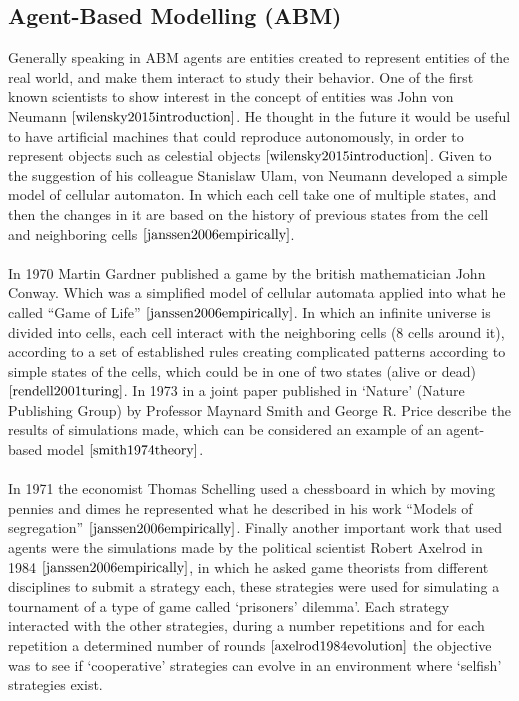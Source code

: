 \subsection{Agent-Based Modelling (ABM)}
Generally speaking in ABM agents are entities created to represent entities of the real world, and make them interact to study their behavior. One of the first known scientists to show interest in the concept of entities was John von Neumann $\cite{wilensky2015introduction}$. He thought in the future it would be useful to have artificial machines that could reproduce autonomously, in order to represent objects such as celestial objects $\cite{wilensky2015introduction}$. Given to the suggestion of his colleague Stanislaw Ulam, von Neumann developed a simple model of cellular automaton. In which each cell take one of multiple states, and then the changes in it are based on the history of previous states from the cell and neighboring cells $\cite{janssen2006empirically}$.
\\\\In 1970 Martin Gardner published a game by the british mathematician John Conway. Which was a simplified model of cellular automata applied into what he called “Game of Life” $\cite{janssen2006empirically}$. In which an infinite universe is divided into cells, each cell interact with the neighboring cells (8 cells around it), according to a set of established rules creating complicated patterns according to simple states of the cells, which could be in one of two states (alive or dead) $\cite{rendell2001turing}$. In 1973 in a joint paper published in `Nature' (Nature Publishing Group)  by Professor Maynard Smith and George R. Price describe the results of simulations made, which can be considered an example of an agent-based model $\cite{smith1974theory}$.
\\\\In 1971 the economist Thomas Schelling used a chessboard in which by moving pennies and dimes he represented what he described in his work ``Models of segregation'' $\cite{janssen2006empirically}$.  Finally another important work that used agents were the simulations made by the political scientist Robert Axelrod in 1984 $\cite{janssen2006empirically}$, in which he asked game theorists from different disciplines to submit a strategy each, these strategies were used for simulating a tournament of a type of game called `prisoners’ dilemma'. Each strategy interacted with the other strategies, during a number repetitions and for each repetition  a determined number of rounds $\cite{axelrod1984evolution}$ the objective was to see if `cooperative' strategies can evolve in an environment where `selfish' strategies exist.

